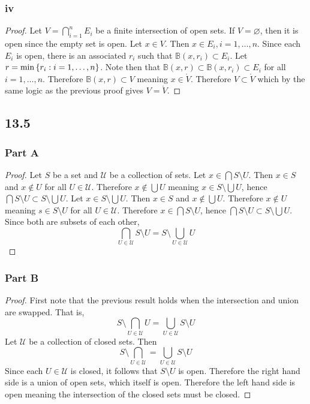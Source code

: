 \documentclass[12pt,titlepage]{extarticle}
\begin{document}
\subsubsection*{iv}
\begin{proof}
    Let $V = \bigcap_{i=1}^n E_i$ be a finite intersection of open sets. If $V = \varnothing$, then it is open since the empty set is open. Let $x \in V$. Then $x \in E_i, i = 1,\ldots,n$. Since each $E_i$ is open, there is an associated $r_i$ such that $\mathbb{B}(x,r_i) \subset E_i$. Let $r = \min\qty{r_i : i = 1,\ldots,n}$. Note then that $\mathbb{B}(x,r) \subset \mathbb{B}(x,r_i) \subset E_i$ for all $i = 1,\ldots,n$. Therefore $\mathbb{B}(x,r) \subset V$ meaning $x \in \mathring{V}$. Therefore $V \subset \mathring{V}$ which by the same logic as the previous proof gives $V = \mathring{V}$.
\end{proof}

\subsection*{13.5}
\subsubsection*{Part A}
\begin{proof}
    Let $S$ be a set and $\mathcal{U}$ be a collection of sets. Let $x \in \bigcap S\setminus U$. Then $x \in S$ and $x \notin U$ for all $U \in \mathcal{U}$. Therefore $x \notin \bigcup U$ meaning $x \in S \setminus \bigcup U$, hence $\bigcap S\setminus U \subset S \setminus \bigcup U$. Let $x \in S \setminus \bigcup U$. Then $x \in S$ and $x \notin \bigcup U$. Therefore $x \notin U$ meaning $s \in S \setminus U$ for all $U \in \mathcal{U}$. Therefore $x \in \bigcap S \setminus U$, hence $\bigcap S \setminus U \subset S \setminus \bigcup U$. Since both are subsets of each other,
    \[
        \bigcap_{U \in \mathcal{U}} S \setminus U = S \setminus \bigcup_{U \in \mathcal{U}} U
    \]
\end{proof}

\subsubsection*{Part B}
\begin{proof}
    First note that the previous result holds when the intersection and union are swapped. That is,
    \[
        S \setminus \bigcap_{U \in \mathcal{U}} U = \bigcup_{U \in \mathcal{U}} S\setminus U
    \]
    Let $\mathcal{U}$ be a collection of closed sets. Then
    \[
        S \setminus \bigcap_{U \in \mathcal{U}} = \bigcup_{U \in \mathcal{U}} S \setminus U
    \]
    Since each $U \in \mathcal{U}$ is closed, it follows that $S \setminus U$ is open. Therefore the right hand side is a union of open sets, which itself is open. Therefore the left hand side is open meaning the intersection of the closed sets must be closed.
\end{proof}
\end{document}
